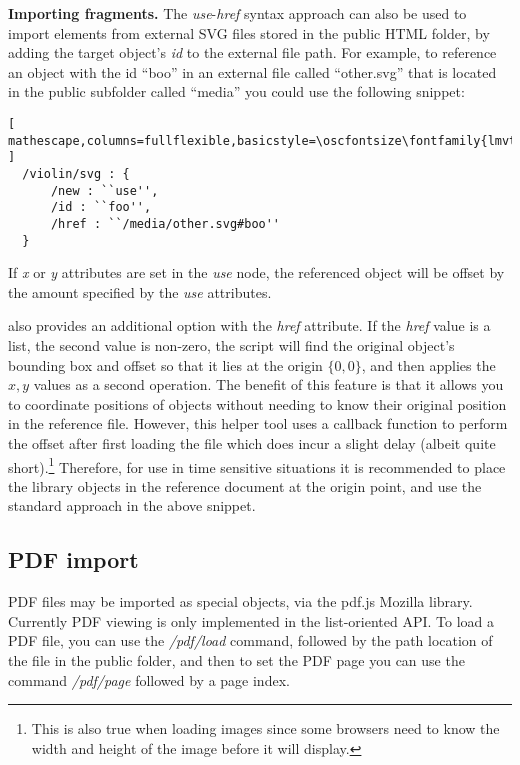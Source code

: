 \medskip
\noindent
\textbf{Importing fragments.} 
The \textit{use}-\textit{href} syntax approach can also be used to import elements from external SVG files stored in the public HTML folder, by adding the target object's \textit{id} to the external file path.
For example, to reference an object with the id ``boo'' in an external file called ``other.svg'' that is located in the public subfolder called ``media'' you could use the following snippet:

\begin{lstlisting}[ mathescape,columns=fullflexible,basicstyle=\oscfontsize\fontfamily{lmvtt}\selectfont ]
  /violin/svg : {
      /new : ``use'',
      /id : ``foo'',
      /href : ``/media/other.svg#boo''
  }
 \end{lstlisting}

If \textit{x} or \textit{y} attributes are set in the \textit{use} node, the referenced object will be offset by the amount specified by the  \textit{use} attributes.

\drawsocket also provides an additional option with the \textit{href} attribute. If the \textit{href} value is a list, the second value is non-zero, the script will find the original object's bounding box and offset so that it lies at the origin $\{0,0\}$, and then applies the ${x,y}$ values as a second operation. The benefit of this feature is that it allows you to coordinate positions of objects without needing to know their original position in the reference file. However, this helper tool uses a callback function to perform the offset after first loading the file which does incur a slight delay (albeit quite short).\footnote{This is also true when loading images since some browsers need to know the width and height of the image before it will display.}
Therefore, for use in time sensitive situations it is recommended to place the library objects in the reference document at the origin point, and use the standard approach in the above snippet.

\subsection{PDF import}\label{sec:pdf}
PDF files may be imported as special \drawsocket objects, via the pdf.js Mozilla library.
Currently PDF viewing is only implemented in the list-oriented API. 
To load a PDF file, you can use the \textit{/pdf/load} command, followed by the path location of the file in the public folder, and then to set the PDF page you can use the command \textit{/pdf/page} followed by a page index.

